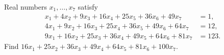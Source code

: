 Real numbers $x_1,\dots,x_7$ satisfy
\[\begin{aligned}x_1+4x_2+9x_3+16x_4+25x_5+36x_6+49x_7&=1,\\4x_1+9x_2+16x_3+25x_4+36x_5+49x_6+64x_7&=12,\\9x_1+16x_2+25x_3+36x_4+49x_5+64x_6+81x_7&=123.\end{aligned}\]
Find $16x_1+25x_2+36x_3+49x_4+64x_5+81x_6+100x_7$.
